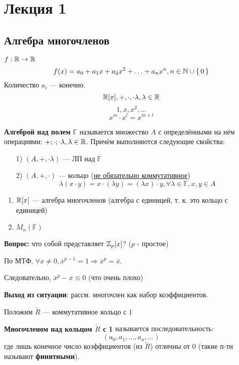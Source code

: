 \section{Лекция 1}

\subsection{Алгебра многочленов}
$f: \mathbb{R} \rightarrow \mathbb{R}$
\[
f(x) = a_0 + a_1 x + a_2 x^{2} + \ldots + a_n x^{n}, n \in \mathbb{N} \cup \set{0}
\]
Количество $a_i$ --- конечно.
\[
\mathbb{R}[x], +, \cdot, \cdot \lambda, \lambda \in \mathbb{R}
\]
\[
1, x, x^{2}, \ldots
\]
\[
x^{m} \cdot x^{l} = x^{m + l}
\]

\begin{definition}
  \textbf{Алгеброй над полем} $\mathbb{F}$ называется множество $A$ с определёнными на нём операциями: $+; \cdot; \cdot \lambda, \lambda \in \mathbb{R}$. Причём выполняются следующие свойства:
  \begin{enumerate}
    \item [1) ] $(A, +, \cdot\lambda)$ --- ЛП над $\mathbb{F}$
    \item [2) ] $(A, +, \cdot)$ --- кольцо (\underline{не обязательно коммутативное})
\[
  \lambda (x \cdot y) = x \cdot (\lambda y) = (\lambda x) \cdot y, \forall \lambda \in \mathbb{F}, x, y \in A
\]
  \end{enumerate}
\end{definition}
\begin{example}
\begin{enumerate}
  \item $\mathbb{R}[x]$ --- алгебра многочленов (алгебра с единицей, т. к. это кольцо с единицей)
  \item $M_n(\mathbb{F})$
\end{enumerate}
\end{example}
\textbf{Вопрос:} что собой представляет $\mathbb{Z}_p[x]$? ($p$ - простое)

  По МТФ, $\forall x \neq 0, \overline{x}^{p - 1} = 1 \Rightarrow \overline{x}^{p} = \overline{x}$.

  Следовательно, $\overline{x}^{p} - \overline{x} \equiv 0$ (что очень плохо)

  \textbf{Выход из ситуации}: рассм. многочлен как набор коэффициентов.

  Положим $\tilde{R}$ --- коммутативное кольцо с $1$
  \begin{definition}
  \textbf{Многочленом над кольцом $\tilde{R}$ с 1} называется последовательность:
  \[
    (a_0, a_1, \ldots, a_n, \ldots)
  \]
  где лишь конечное число коэффициентов (из $\tilde{R}$) отличны от $0$ (такие п-ти называют \textbf{финитными}).
  \end{definition}

